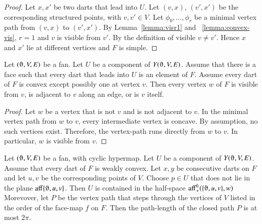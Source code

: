 \begin{proof} Let $x,x'$ be two darts that lead into $U$.  Let
$(v,x)$, $(v',x')$ be the corresponding structured points, with $v,v'\in V$.
Let $\phi_0,\ldots,\phi_r$ be a minimal vertex path from $(v,x)$ to 
$(v',x')$.  By Lemma~\ref{lemma:visr1}  and ~\ref{lemma:convex-vis}, 
$r=1$ and $v$ is visible from $v'$.  By the definition of visible
$v\ne v'$.  Hence $x$ and $x'$ lie at different vertices and $F$ is simple.
\end{proof}

\begin{lemma}\label{lemma:details}
Let $(\orgn,V,E)$ be a fan.  Let $U$ be a component of $Y(\orgn,V,E)$.  Assume that there is a face such that every dart that leads into $U$ is an element of $F$.  Assume every dart of $F$ is convex except possibly one
at vertex $v$.  Then  every vertex $w$ of $F$ is visible from $v$, is adjacent to $v$ along an edge, or is $v$ itself.
\end{lemma}

\begin{proof}  Let $w$ be a vertex that is not $v$ and is not adjacent to $v$. 
In the minimal vertex path from $w$ to $v$, every intermediate
vertex is concave.  By assumption, no such vertices exist.  Therefore,
the vertex-path runs directly from $w$ to $v$.  In particular,
$w$ is visible from $v$.
\end{proof}

\begin{lemma}\label{lemma:convex-hyper}  
Let $(\orgn,V,E)$ be a fan, with cyclic hypermap.  
Let $U$ be a component of $Y(\orgn,V,E)$.
Assume
that every dart of $F$ is weakly convex. Let $x,y$
be consecutive darts on $F$ and let $u,v$ be the corresponding points of $V$.
Choose $p\in U$ that does not lie in the plane $\op{aff}\{\orgn,u,v\}$.
Then $U$
is contained in the half-space $\op{aff}_+^0(\{\orgn,u,v\},w)$
Morevover,
let $P$ be the vertex path that steps through the vertices of $V$ listed
in the order of the face-map $f$ on $F$.  Then the path-length of the closed
path $P$ is at most $2\pi$.
\end{lemma}


